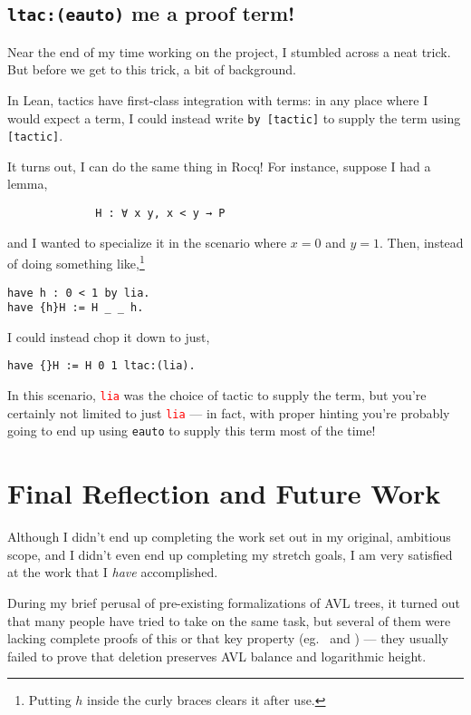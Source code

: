 \documentclass[acmsmall, authorversion, nonacm, overload]{acmart}
\begin{document}
\subsection{\texttt{ltac:(eauto)} me a proof term!}

Near the end of my time working on the project, I stumbled across a neat trick.
But before we get to this trick, a bit of background.

In Lean, tactics have first-class integration with terms:
in any place where I would expect a term, I could instead write \texttt{by [tactic]}
to supply the term using \verb|[tactic]|.

It turns out, I can do the same thing in Rocq!
For instance, suppose I had a lemma,
\begin{figure}[h!]
  \centering
  \begin{minipage}{0.5\textwidth}
    \begin{verbatim}
        H : ∀ x y, x < y → P
    \end{verbatim}
  \end{minipage}
  \end{figure}

and I wanted to specialize it in the scenario where $x = 0$ and $y = 1$.
Then, instead of doing something like,\footnote{Putting $h$ inside the curly braces clears it after use.}
\begin{verbatim}
have h : 0 < 1 by lia.
have {h}H := H _ _ h.
\end{verbatim}
I could instead chop it down to just,
\begin{verbatim}
have {}H := H 0 1 ltac:(lia).
\end{verbatim}
In this scenario, \texttt{\textcolor{red}{lia}} was the choice of tactic to supply the term,
but you're certainly not limited to just \texttt{\textcolor{red}{lia}} ---
in fact, with proper hinting you're probably going to end up using \texttt{eauto}
to supply this term most of the time!

\section{Final Reflection and Future Work}
Although I didn't end up completing the work set out in my original, ambitious scope,
and I didn't even end up completing my stretch goals,
I am very satisfied at the work that I \emph{have} accomplished.

During my brief perusal of pre-existing formalizations of AVL trees,
it turned out that many people have tried to take on the same task,
but several of them were lacking complete proofs of this or that key property (eg.\ \cite{AVL-Lean} and \cite{AVL-Coq-fail}) --- they usually failed to prove that deletion preserves AVL balance and logarithmic height.
\end{document}
